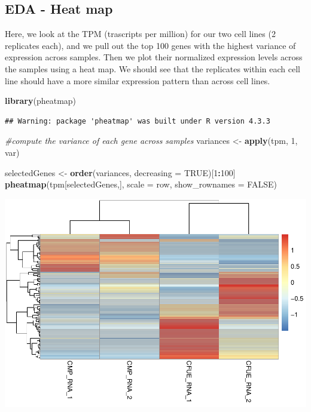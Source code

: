 \documentclass[
]{article}
\newenvironment{Shaded}{\begin{snugshade}}{\end{snugshade}}
\newcommand{\AttributeTok}[1]{\textcolor[rgb]{0.13,0.29,0.53}{#1}}
\newcommand{\CommentTok}[1]{\textcolor[rgb]{0.56,0.35,0.01}{\textit{#1}}}
\newcommand{\ConstantTok}[1]{\textcolor[rgb]{0.56,0.35,0.01}{#1}}
\newcommand{\DecValTok}[1]{\textcolor[rgb]{0.00,0.00,0.81}{#1}}
\newcommand{\FunctionTok}[1]{\textcolor[rgb]{0.13,0.29,0.53}{\textbf{#1}}}
\newcommand{\NormalTok}[1]{#1}
\newcommand{\OtherTok}[1]{\textcolor[rgb]{0.56,0.35,0.01}{#1}}
\newcommand{\SpecialCharTok}[1]{\textcolor[rgb]{0.81,0.36,0.00}{\textbf{#1}}}
\newcommand{\StringTok}[1]{\textcolor[rgb]{0.31,0.60,0.02}{#1}}
\begin{document}
\hypertarget{eda---heat-map}{%
\subsection{EDA - Heat map}\label{eda---heat-map}}

Here, we look at the TPM (trascripts per million) for our two cell lines
(2 replicates each), and we pull out the top 100 genes with the highest
variance of expression across samples. Then we plot their normalized
expression levels across the samples using a heat map. We should see
that the replicates within each cell line should have a more similar
expression pattern than across cell lines.

\begin{Shaded}
\begin{Highlighting}[]
\FunctionTok{library}\NormalTok{(pheatmap)}
\end{Highlighting}
\end{Shaded}

\begin{verbatim}
## Warning: package 'pheatmap' was built under R version 4.3.3
\end{verbatim}

\begin{Shaded}
\begin{Highlighting}[]
\CommentTok{\#compute the variance of each gene across samples}
\NormalTok{variances }\OtherTok{\textless{}{-}} \FunctionTok{apply}\NormalTok{(tpm, }\DecValTok{1}\NormalTok{, var)}

\NormalTok{selectedGenes }\OtherTok{\textless{}{-}} \FunctionTok{order}\NormalTok{(variances, }\AttributeTok{decreasing =} \ConstantTok{TRUE}\NormalTok{)[}\DecValTok{1}\SpecialCharTok{:}\DecValTok{100}\NormalTok{]}
\FunctionTok{pheatmap}\NormalTok{(tpm[selectedGenes,], }\AttributeTok{scale =} \StringTok{\textquotesingle{}row\textquotesingle{}}\NormalTok{, }\AttributeTok{show\_rownames =} \ConstantTok{FALSE}\NormalTok{)}
\end{Highlighting}
\end{Shaded}

\includegraphics{RNA_Analysis_23_files/figure-latex/heat map-1.pdf}
\end{document}

